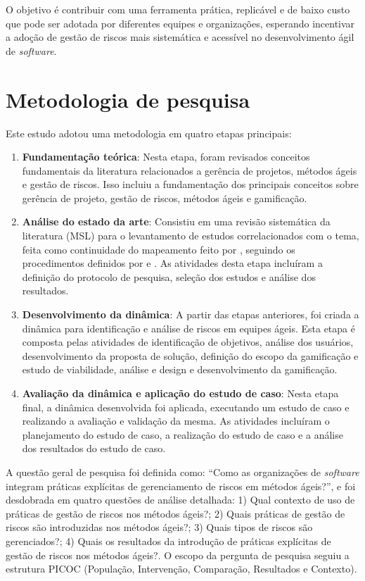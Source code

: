 \documentclass[12pt]{article}
\begin{document}
O objetivo é contribuir com uma ferramenta prática, replicável e de baixo custo que pode ser adotada por diferentes equipes e organizações, esperando incentivar a adoção de gestão de riscos mais sistemática e acessível no desenvolvimento ágil de \textit{software}.

\section{Metodologia de pesquisa} 

Este estudo adotou uma metodologia em quatro etapas principais:

\begin{enumerate}
\item \textbf{Fundamentação teórica}: Nesta etapa, foram revisados conceitos fundamentais da literatura relacionados a gerência de projetos, métodos ágeis e gestão de riscos. Isso incluiu a fundamentação dos principais conceitos sobre gerência de projeto, gestão de riscos, métodos ágeis e gamificação.
\item \textbf{Análise do estado da arte}: Consistiu em uma revisão sistemática da literatura (MSL) para o levantamento de estudos correlacionados com o tema, feita como continuidade do mapeamento feito por \cite{garcia2023agreed}, seguindo os procedimentos definidos por \cite{PETERSEN20151} e \cite{Petersen}. As atividades desta etapa incluíram a definição do protocolo de pesquisa, seleção dos estudos e análise dos resultados.
\item \textbf{Desenvolvimento da dinâmica}: A partir das etapas anteriores, foi criada a dinâmica para identificação e análise de riscos em equipes ágeis. Esta etapa é composta pelas atividades de identificação de objetivos, análise dos usuários, desenvolvimento da proposta de solução, definição do escopo da gamificação e estudo de viabilidade, análise e design e desenvolvimento da gamificação.
\item \textbf{Avaliação da dinâmica e aplicação do estudo de caso}: Nesta etapa final, a dinâmica desenvolvida foi aplicada, executando um estudo de caso e realizando a avaliação e validação da mesma. As atividades incluíram o planejamento do estudo de caso, a realização do estudo de caso e a análise dos resultados do estudo de caso.
\end{enumerate}

A questão geral de pesquisa foi definida como: “Como as organizações de \textit{software} integram práticas explícitas de gerenciamento de riscos em métodos ágeis?”, e foi desdobrada em quatro questões de análise detalhada: 1) Qual contexto de uso de práticas de gestão de riscos nos métodos ágeis?; 2) Quais práticas de gestão de riscos são introduzidas nos métodos ágeis?; 3) Quais tipos de riscos são gerenciados?; 4) Quais os resultados da introdução de práticas explícitas de gestão de riscos nos métodos ágeis?. O escopo da pergunta de pesquisa seguiu a estrutura PICOC (População, Intervenção, Comparação, Resultados e Contexto).
\end{document}
